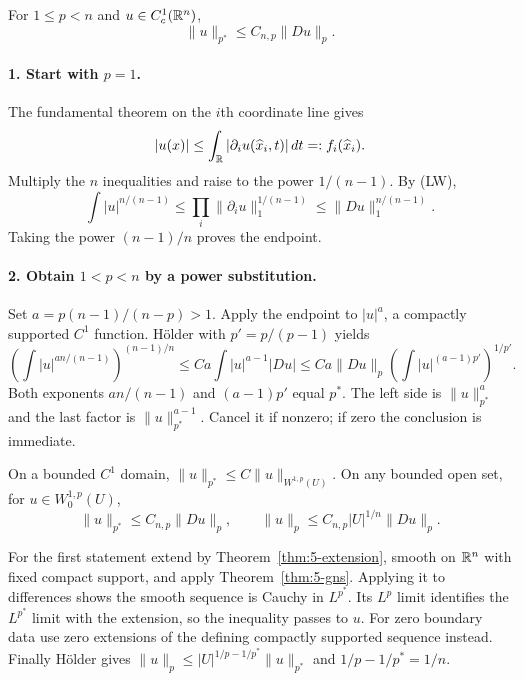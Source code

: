 \begin{theorem}\label{thm:5-gns}
For $1\leq p<n$ and $u\in C_c^1(\mathbb{R}^n)$,
\[
 \|u\|_{p^*}\leq C_{n,p}\|Du\|_p.
\]
\end{theorem}
\begin{expandedproof}
\paragraph{1. Start with $p=1$.}
The fundamental theorem on the $i$th coordinate line gives
\[
 |u(x)|\leq\int_{\mathbb{R}}|\partial_i u(\widehat x_i,t)|\,dt
 =:f_i(\widehat x_i).
\]
Multiply the $n$ inequalities and raise to the power $1/(n-1)$.
By (LW),
\[
 \int|u|^{n/(n-1)}
 \leq\prod_i\|\partial_i u\|_1^{1/(n-1)}
 \leq\|Du\|_1^{n/(n-1)}.
\]
Taking the power $(n-1)/n$ proves the endpoint.

\paragraph{2. Obtain $1<p<n$ by a power substitution.}
Set $a=p(n-1)/(n-p)>1$. Apply the endpoint to $|u|^a$, a compactly
supported $C^1$ function. H\"older with $p'=p/(p-1)$ yields
\[
 \left(\int|u|^{an/(n-1)}\right)^{(n-1)/n}
 \leq Ca\int|u|^{a-1}|Du|
 \leq Ca\|Du\|_p
       \left(\int|u|^{(a-1)p'}\right)^{1/p'}.
\]
Both exponents $an/(n-1)$ and $(a-1)p'$ equal $p^*$.
The left side is $\|u\|_{p^*}^a$ and the last factor is
$\|u\|_{p^*}^{a-1}$. Cancel it if nonzero; if zero the conclusion
is immediate.
\end{expandedproof}
\Needspace{45mm}

\begin{corollary}\label{thm:5-domain-gns}
On a bounded $C^1$ domain,
$\|u\|_{p^*}\leq C\|u\|_{W^{1,p}(U)}$.
On any bounded open set, for $u\in W^{1,p}_0(U)$,
\[
 \|u\|_{p^*}\leq C_{n,p}\|Du\|_p,\qquad
 \|u\|_p\leq C_{n,p}|U|^{1/n}\|Du\|_p .
\]
\end{corollary}
\begin{expandedproof}
For the first statement extend by Theorem~\ref{thm:5-extension},
smooth on $\mathbb{R}^n$ with fixed compact support, and apply
Theorem~\ref{thm:5-gns}. Applying it to differences shows the smooth
sequence is Cauchy in $L^{p^*}$. Its $L^p$ limit identifies the
$L^{p^*}$ limit with the extension, so the inequality passes to $u$.
For zero boundary data use zero extensions of the defining compactly
supported sequence instead. Finally H\"older gives
$\|u\|_p\leq|U|^{1/p-1/p^*}\|u\|_{p^*}$ and
$1/p-1/p^*=1/n$.
\end{expandedproof}
\Needspace{45mm}

